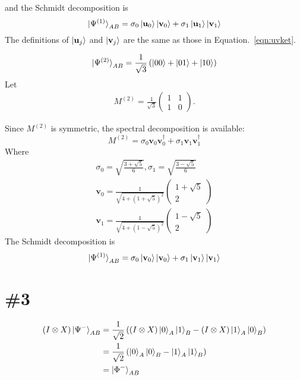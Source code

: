 \documentclass[a4paper,11pt]{article}
\begin{document}
and the Schmidt decomposition is
\begin{equation}
    \ket{\Psi^{(1)}}_{AB}=\sigma_0\ket{\mathbf u_0}\ket{\mathbf v_0} + \sigma_1\ket{\mathbf u_1}\ket{\mathbf v_1}
\end{equation}
The definitions of $\ket{\mathbf u_j}$ and $\ket{\mathbf v_j}$ are the same as those in Equation.~\ref{eqn:uvket}.

\begin{equation}
    \ket{\Psi^{(2)}}_{AB}
    =\frac{1}{\sqrt{3}}\left(\ket{00}+\ket{01}+\ket{10}\right)
\end{equation}
Let
\begin{align}
    M^{(2)}=\frac{1}{\sqrt3}\begin{pmatrix}
        1 & 1 \\
        1 & 0
    \end{pmatrix}.
\end{align}

Since $M^{(2)}$ is symmetric, the spectral decomposition is available:
\begin{equation}
    M^{(2)} = \sigma_0 \mathbf v_0\mathbf v_0^\dagger + \sigma_1 \mathbf v_1\mathbf v_1^\dagger
\end{equation}
Where
\begin{gather}
    \sigma_0=\sqrt{\frac{3+\sqrt{5}}{6}}, \sigma_1=\sqrt{\frac{3-\sqrt{5}}{6}} \\
    \mathbf v_0 = \frac{1}{\sqrt{4+(1+\sqrt{5})^2}}\begin{pmatrix}
        1+\sqrt{5} \\
        2
    \end{pmatrix}\\
    \mathbf v_1 = \frac{1}{\sqrt{4+(1-\sqrt{5})^2}}\begin{pmatrix}
        1-\sqrt{5} \\
        2
    \end{pmatrix}
\end{gather}
The Schmidt decomposition is
\begin{equation}
    \ket{\Psi^{(1)}}_{AB}=\sigma_0\ket{\mathbf v_0}\ket{\mathbf v_0} + \sigma_1\ket{\mathbf v_1}\ket{\mathbf v_1}
\end{equation}

\section{\#3}

\begin{align}
    (I\otimes X)\ket{\Psi^-}_{AB}
    &=\frac{1}{\sqrt 2}\left((I\otimes X)\ket{0}_A\ket{1}_B-(I\otimes X)\ket{1}_A\ket{0}_B\right) \\
    &=\frac{1}{\sqrt 2}\left(\ket{0}_A\ket{0}_B-\ket{1}_A\ket{1}_B\right)\\
    &=\ket{\Phi^-}_{AB}
\end{align}
\end{document}
